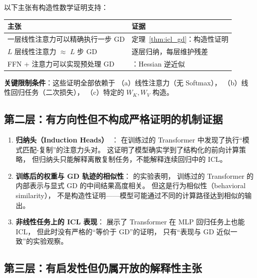 以下主张有构造性数学证明支持：

\begin{center}
\begin{tabular}{p{6cm} p{6.5cm}}
\toprule
\textbf{主张} & \textbf{证据} \\
\midrule
一层线性注意力可以精确执行一步 GD
& 定理~\ref{thm:icl_gd}：构造性证明 \\
$L$ 层线性注意力 $\approx$ $L$ 步 GD
& 逐层归纳，每层维护残差 \\
FFN + 注意力可以实现预处理 GD
& \citet{ahn2023transformers}：Hessian 逆近似 \\
\bottomrule
\end{tabular}
\end{center}

\textbf{关键限制条件}：这些证明全部依赖于
（a）线性注意力（无 Softmax），
（b）线性回归任务（二次损失），
（c）特定的 $W_K, W_V$ 构造。

\subsection*{第二层：有方向性但不构成严格证明的机制证据}

\begin{enumerate}
  \item \textbf{归纳头（Induction Heads）}~\citep{olsson2022context}：
    在训练过的 Transformer 中发现了执行``模式匹配-复制''的注意力头对。
    这证明了模型确实学到了结构化的前向计算策略，
    但归纳头只能解释离散复制任务，不能解释连续回归中的 ICL。

  \item \textbf{训练后的权重与 GD 轨迹的相似性}：
    \citet{von2022transformers} 的实验表明，
    训练过的 Transformer 的内部表示与显式 GD 的中间结果高度相关。
    但这是行为相似性（behavioral similarity），
    不是构造性证明——模型可能通过不同的计算路径达到相似的输出。

  \item \textbf{非线性任务上的 ICL 表现}：
    \citet{garg2022what} 展示了 Transformer 在 MLP 回归任务上也能 ICL，
    但此时没有严格的``等价于 GD''的证明，
    只有``表现与 GD 近似一致''的实验观察。
\end{enumerate}

\subsection*{第三层：有启发性但仍属开放的解释性主张}

